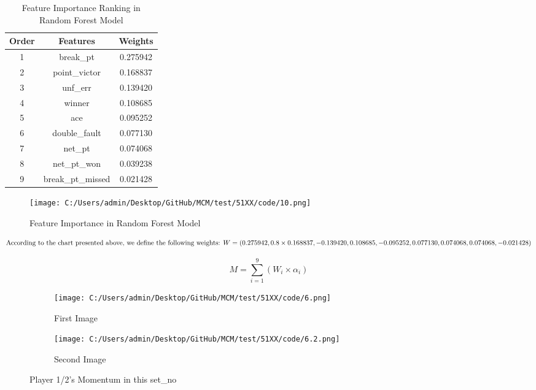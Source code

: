 \documentclass{mcmthesis}
\begin{document}
\begin{table}[h] 
\centering  
\caption{Feature Importance Ranking in Random Forest Model} 
\label{tab2} 
\begin{tabular}{ccc} 
\toprule  
Order      & Features   & Weights  \\
\midrule  
1  & break\_pt & 0.275942 \\ 
2  & point\_victor & 0.168837 \\
3  & unf\_err & 0.139420 \\
4  & winner & 0.108685 \\
5  & ace & 0.095252 \\
6  & double\_fault & 0.077130 \\
7  & net\_pt & 0.074068 \\
8  & net\_pt\_won & 0.039238 \\
9  & break\_pt\_missed & 0.021428 \\

\bottomrule  %
\end{tabular}
\end{table}

\begin{figure}[h]   
\centering          
\texttt{[image: C:/Users/admin/Desktop/GitHub/MCM/test/51XX/code/10.png]}
\caption{Feature Importance in Random Forest Model} \label{fig5}    
\end{figure}

\begin{equation} \label{eq1}
\text{According to the chart presented above, we define the following weights: } \\
W = (0.275942, 0.8 \times 0.168837, -0.139420, 0.108685, -0.095252, 0.077130, 0.074068, 0.074068, -0.021428)
\end{equation}

\begin{equation} \label{eq2}
M = \sum_{i=1}^{9} (W_i \times \alpha_i)
\end{equation}


\begin{figure}[h]
    \centering
    \begin{subfigure}{0.45\textwidth}  
        \texttt{[image: C:/Users/admin/Desktop/GitHub/MCM/test/51XX/code/6.png]}
        \caption{First Image}  
        \label{fig:first}
    \end{subfigure}
    \hfill
    \begin{subfigure}{0.45\textwidth}
        \texttt{[image: C:/Users/admin/Desktop/GitHub/MCM/test/51XX/code/6.2.png]}
        \caption{Second Image}  %
        \label{fig:second}
    \end{subfigure}
    
    \caption{Player 1/2’s Momentum in this set\_no} 
    \label{fig:twoimages}
\end{figure}
\end{document}
